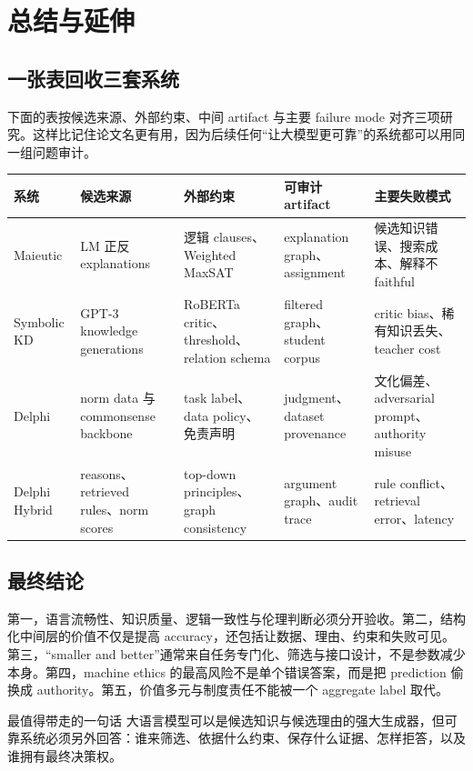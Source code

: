 \section{总结与延伸}

\subsection{一张表回收三套系统}

下面的表按候选来源、外部约束、中间 artifact 与主要 failure mode 对齐三项研究。这样比记住论文名更有用，因为后续任何“让大模型更可靠”的系统都可以用同一组问题审计。

\begin{longtable}{@{}L{0.13\textwidth}L{0.16\textwidth}L{0.19\textwidth}L{0.18\textwidth}L{0.19\textwidth}@{}}
\toprule
系统 & 候选来源 & 外部约束 & 可审计 artifact & 主要失败模式 \\
\midrule
Maieutic & LM 正反 explanations & 逻辑 clauses、Weighted MaxSAT & explanation graph、assignment & 候选知识错误、搜索成本、解释不 faithful \\
Symbolic KD & GPT-3 knowledge generations & RoBERTa critic、threshold、relation schema & filtered graph、student corpus & critic bias、稀有知识丢失、teacher cost \\
Delphi & norm data 与 commonsense backbone & task label、data policy、免责声明 & judgment、dataset provenance & 文化偏差、adversarial prompt、authority misuse \\
Delphi Hybrid & reasons、retrieved rules、norm scores & top-down principles、graph consistency & argument graph、audit trace & rule conflict、retrieval error、latency \\
\bottomrule
\end{longtable}

\subsection{最终结论}

第一，语言流畅性、知识质量、逻辑一致性与伦理判断必须分开验收。第二，结构化中间层的价值不仅是提高 accuracy，还包括让数据、理由、约束和失败可见。第三，“smaller and better”通常来自任务专门化、筛选与接口设计，不是参数减少本身。第四，machine ethics 的最高风险不是单个错误答案，而是把 prediction 偷换成 authority。第五，价值多元与制度责任不能被一个 aggregate label 取代。

\begin{importantbox}{最值得带走的一句话}
大语言模型可以是候选知识与候选理由的强大生成器，但可靠系统必须另外回答：谁来筛选、依据什么约束、保存什么证据、怎样拒答，以及谁拥有最终决策权。
\end{importantbox}

